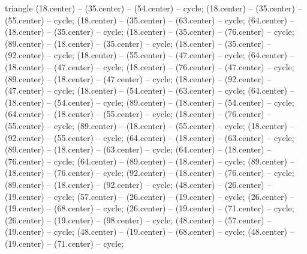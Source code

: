 \begin{pgfonlayer}{triangle}
 (18.center) -- (35.center) -- (54.center) -- cycle; 
 (18.center) -- (35.center) -- (55.center) -- cycle; 
 (18.center) -- (35.center) -- (63.center) -- cycle; 
 (64.center) -- (18.center) -- (35.center) -- cycle; 
 (18.center) -- (35.center) -- (76.center) -- cycle; 
 (89.center) -- (18.center) -- (35.center) -- cycle; 
 (18.center) -- (35.center) -- (92.center) -- cycle; 
 (18.center) -- (55.center) -- (47.center) -- cycle; 
 (64.center) -- (18.center) -- (47.center) -- cycle; 
 (18.center) -- (76.center) -- (47.center) -- cycle; 
 (89.center) -- (18.center) -- (47.center) -- cycle; 
 (18.center) -- (92.center) -- (47.center) -- cycle; 
 (18.center) -- (54.center) -- (63.center) -- cycle; 
 (64.center) -- (18.center) -- (54.center) -- cycle; 
 (89.center) -- (18.center) -- (54.center) -- cycle; 
 (64.center) -- (18.center) -- (55.center) -- cycle; 
 (18.center) -- (76.center) -- (55.center) -- cycle; 
 (89.center) -- (18.center) -- (55.center) -- cycle; 
 (18.center) -- (92.center) -- (55.center) -- cycle; 
 (64.center) -- (18.center) -- (63.center) -- cycle; 
 (89.center) -- (18.center) -- (63.center) -- cycle; 
 (64.center) -- (18.center) -- (76.center) -- cycle; 
 (64.center) -- (89.center) -- (18.center) -- cycle; 
 (89.center) -- (18.center) -- (76.center) -- cycle; 
 (92.center) -- (18.center) -- (76.center) -- cycle; 
 (89.center) -- (18.center) -- (92.center) -- cycle; 
 (48.center) -- (26.center) -- (19.center) -- cycle; 
 (57.center) -- (26.center) -- (19.center) -- cycle; 
 (26.center) -- (19.center) -- (68.center) -- cycle; 
 (26.center) -- (19.center) -- (71.center) -- cycle; 
 (26.center) -- (19.center) -- (98.center) -- cycle; 
 (48.center) -- (57.center) -- (19.center) -- cycle; 
 (48.center) -- (19.center) -- (68.center) -- cycle; 
 (48.center) -- (19.center) -- (71.center) -- cycle; 

\end{pgfonlayer}
